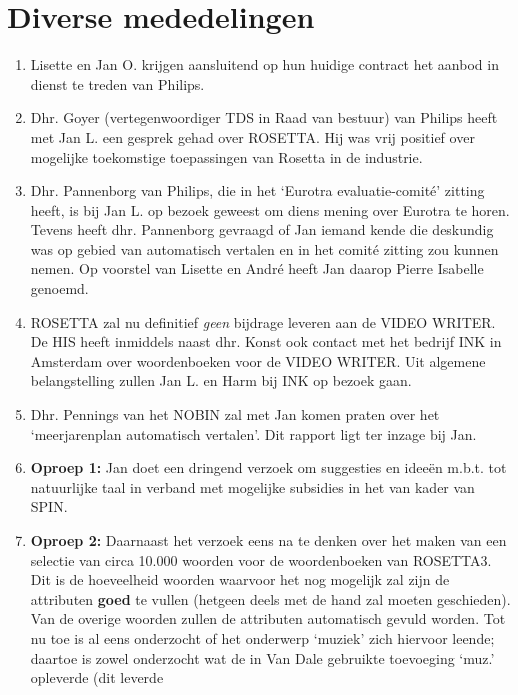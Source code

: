\section {Diverse mededelingen}
\begin{enumerate}
  \item Lisette en Jan O. krijgen aansluitend op hun huidige contract het 
        aanbod in dienst te treden van Philips.
  \item Dhr. Goyer (vertegenwoordiger TDS in Raad van bestuur) van Philips 
        heeft met Jan L. een gesprek gehad over ROSETTA. Hij was vrij positief 
        over mogelijke toekomstige toepassingen van Rosetta in de industrie.
  \item Dhr. Pannenborg van Philips, die in het `Eurotra evaluatie-comit\'{e}'
        zitting heeft, is bij Jan L. op bezoek geweest om diens mening over 
        Eurotra te horen. Tevens heeft dhr. Pannenborg gevraagd of Jan iemand
        kende die deskundig was op gebied van automatisch vertalen en in het 
        comit\'{e} zitting zou kunnen nemen. Op voorstel van Lisette
        en Andr\'{e} heeft Jan daarop Pierre Isabelle genoemd.
  \item ROSETTA zal nu definitief {\em geen} bijdrage leveren aan de VIDEO 
        WRITER. De
        HIS heeft inmiddels naast dhr. Konst ook contact met het bedrijf INK in
        Amsterdam over woordenboeken voor de VIDEO WRITER. Uit algemene 
        belangstelling zullen Jan L. en Harm bij INK op bezoek gaan.
  \item Dhr. Pennings van het NOBIN zal met Jan komen praten over het 
        `meerjarenplan automatisch vertalen'. Dit rapport ligt ter inzage bij 
        Jan.
  \item {\bf Oproep 1:} Jan doet een dringend verzoek om suggesties en 
        idee\"{e}n m.b.t. tot natuurlijke taal in verband met 
        mogelijke subsidies in het van kader van SPIN.
  \item {\bf Oproep 2:} Daarnaast het verzoek eens na te denken over het maken 
        van een selectie van circa 10.000 woorden voor de woordenboeken van 
        ROSETTA3. Dit is de hoeveelheid woorden waarvoor het nog mogelijk zal 
        zijn de attributen {\bf goed} te vullen (hetgeen deels met de hand zal 
        moeten geschieden). Van de overige woorden zullen de attributen
        automatisch gevuld worden. Tot nu toe is al eens onderzocht of het 
        onderwerp `muziek' zich hiervoor leende; daartoe is zowel onderzocht
        wat de in Van Dale gebruikte toevoeging `muz.' opleverde (dit leverde

\end{enumerate}
